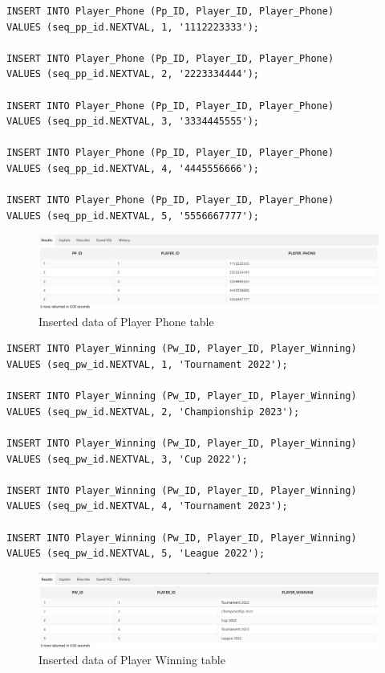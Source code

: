 \begin{lstlisting}[caption={Inserting data into Player\_Phone tables},label={lst:insert_Player_Phone}]
INSERT INTO Player_Phone (Pp_ID, Player_ID, Player_Phone)
VALUES (seq_pp_id.NEXTVAL, 1, '1112223333');

INSERT INTO Player_Phone (Pp_ID, Player_ID, Player_Phone)
VALUES (seq_pp_id.NEXTVAL, 2, '2223334444');

INSERT INTO Player_Phone (Pp_ID, Player_ID, Player_Phone)
VALUES (seq_pp_id.NEXTVAL, 3, '3334445555');

INSERT INTO Player_Phone (Pp_ID, Player_ID, Player_Phone)
VALUES (seq_pp_id.NEXTVAL, 4, '4445556666');

INSERT INTO Player_Phone (Pp_ID, Player_ID, Player_Phone)
VALUES (seq_pp_id.NEXTVAL, 5, '5556667777');
\end{lstlisting}
\begin{figure}[H]
    \centering
    \includegraphics[width=1\textwidth]{images/TableData/PLAYER_PHONE.png}
    \caption{Inserted data of Player Phone table}
\end{figure}


\begin{lstlisting}[caption={Inserting data into Player\_Winning tables},label={lst:insert_Player_Winning}]
INSERT INTO Player_Winning (Pw_ID, Player_ID, Player_Winning)
VALUES (seq_pw_id.NEXTVAL, 1, 'Tournament 2022');

INSERT INTO Player_Winning (Pw_ID, Player_ID, Player_Winning)
VALUES (seq_pw_id.NEXTVAL, 2, 'Championship 2023');

INSERT INTO Player_Winning (Pw_ID, Player_ID, Player_Winning)
VALUES (seq_pw_id.NEXTVAL, 3, 'Cup 2022');

INSERT INTO Player_Winning (Pw_ID, Player_ID, Player_Winning)
VALUES (seq_pw_id.NEXTVAL, 4, 'Tournament 2023');

INSERT INTO Player_Winning (Pw_ID, Player_ID, Player_Winning)
VALUES (seq_pw_id.NEXTVAL, 5, 'League 2022');
\end{lstlisting}
\begin{figure}[H]
    \centering
    \includegraphics[width=1\textwidth]{images/TableData/PLAYER_WINNING.png}
    \caption{Inserted data of Player Winning table}
\end{figure}


